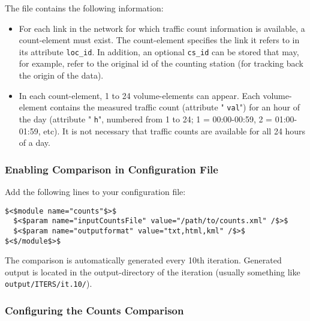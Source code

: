 \documentclass[a4paper,11pt]{report}
\begin{document}
The file contains the following information:
\begin{itemize}
	\item For each link in the network for which traffic count information  is available, a count-element must exist. The count-element specifies  the link it refers to in its attribute 
\texttt{loc\_id}. In addition, an optional 
\texttt{cs\_id}  can be stored that may, for example, refer to the original id of the  counting station (for tracking back the origin of the data).
	\item In each count-element, 1 to 24 volume-elements can appear. Each volume-element contains the measured traffic count (attribute "
\texttt{val}") for an hour of the day (attribute "
\texttt{h}",  numbered from 1 to 24; 1 = 00:00-00:59, 2 = 01:00-01:59, etc). It is  not necessary that traffic counts are available for all 24 hours of a  day.
\end{itemize}


\subsubsection{Enabling Comparison in Configuration File}

Add the following lines to your configuration file:
\begin{verbatim}
$<$module name="counts"$>$
  $<$param name="inputCountsFile" value="/path/to/counts.xml" /$>$
  $<$param name="outputformat" value="txt,html,kml" /$>$
$<$/module$>$

\end{verbatim}

The comparison is automatically generated every 10th iteration.  Generated output is located in the output-directory of the iteration  (usually something like
\texttt{output/ITERS/it.10/}).


\subsubsection{Configuring the Counts Comparison}
\end{document}
